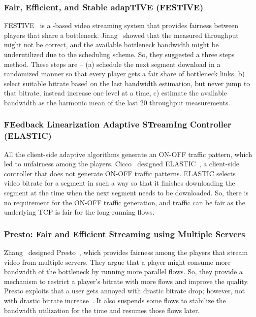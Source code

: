 \subsubsection{Fair, Efficient, and Stable adapTIVE (FESTIVE)}
FESTIVE~\cite{10.1145/2413176.2413189} is a -based video streaming system that provides fairness between players that share a bottleneck. Jiang \etal\ showed that the measured throughput might not be correct, and the available bottleneck bandwidth might be underutilized due to the scheduling scheme. So, they suggested a three steps method. These steps are --
(a) schedule the next segment download in a randomized manner so that every player gets a fair share of bottleneck links,
b) select suitable bitrate based on the last bandwidth estimation, but never jump to that bitrate, instead increase one level at a time,
c) estimate the available bandwidth as the harmonic mean of the last 20 throughput measurements.


\subsubsection{FEedback Linearization Adaptive STreamIng Controller (ELASTIC)}
All the client-side adaptive algorithms generate an ON-OFF traffic pattern, which led to unfairness among the players. Cicco \etal\ designed ELASTIC~\cite{6691442}, a client-side controller that does not generate ON-OFF traffic patterns. ELASTIC selects video bitrate for a segment in such a way so that it finishes downloading the segment at the time when the next segment needs to be downloaded. So, there is no requirement for the ON-OFF traffic generation, and traffic can be fair as the underlying \ac{TCP} is fair for the long-running flows.

\subsubsection{Presto: Fair and Efficient Streaming using Multiple Servers}
Zhang \etal\ designed Presto~\cite{7249417}, which provides fairness among the players that stream video from multiple servers. They argue that a player might consume more bandwidth of the bottleneck by running more parallel flows. So, they provide a mechanism to restrict a player's bitrate with more flows and improve the quality. Presto exploits that a user gets annoyed with drastic bitrate drop; however, not with drastic bitrate increase~\cite{10.1145/2018602.2018611}. It also suspends some flows to stabilize the bandwidth utilization for the time and resumes those flows later.

